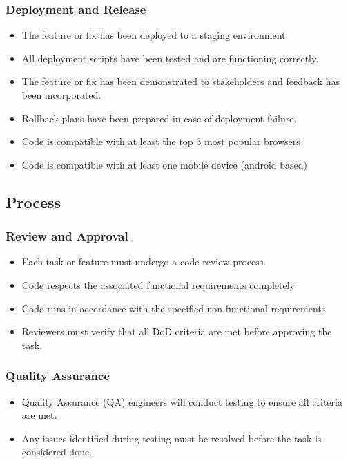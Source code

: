 \subsubsection{Deployment and Release}
\begin{itemize}
    \item The feature or fix has been deployed to a staging environment.
    \item All deployment scripts have been tested and are functioning correctly.
    \item The feature or fix has been demonstrated to stakeholders and feedback has been incorporated.
    \item Rollback plans have been prepared in case of deployment failure.
	\item Code is compatible with at least the top 3 most popular browsers
	\item Code is compatible with at least one mobile device (android based)
\end{itemize}


\subsection{Process}

\subsubsection{Review and Approval}
\begin{itemize}
    \item Each task or feature must undergo a code review process.
	\item Code respects the associated functional requirements completely
	\item Code runs in accordance with the specified non-functional requirements
    \item Reviewers must verify that all DoD criteria are met before approving the task.
\end{itemize}

\subsubsection{Quality Assurance}
\begin{itemize}
    \item Quality Assurance (QA) engineers will conduct testing to ensure all criteria are met.
    \item Any issues identified during testing must be resolved before the task is considered done.
\end{itemize}

